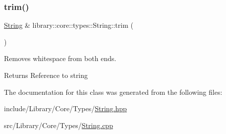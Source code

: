 \mbox{\label{classlibrary_1_1core_1_1types_1_1_string_a42426ffb11bb0b2789ba0991064a01b5}} 
\subsubsection{\texorpdfstring{trim()}{trim()}}
{\footnotesize\ttfamily \mbox{\hyperlink{classlibrary_1_1core_1_1types_1_1_string}{String}} \& library\+::core\+::types\+::\+String\+::trim (\begin{DoxyParamCaption}{ }\end{DoxyParamCaption})}



Removes whitespace from both ends. 

\begin{DoxyReturn}{Returns}
Reference to string 
\end{DoxyReturn}


The documentation for this class was generated from the following files\+:\begin{DoxyCompactItemize}
\item 
include/\+Library/\+Core/\+Types/\mbox{\hyperlink{_string_8hpp}{String.\+hpp}}\item 
src/\+Library/\+Core/\+Types/\mbox{\hyperlink{_string_8cpp}{String.\+cpp}}\end{DoxyCompactItemize}
